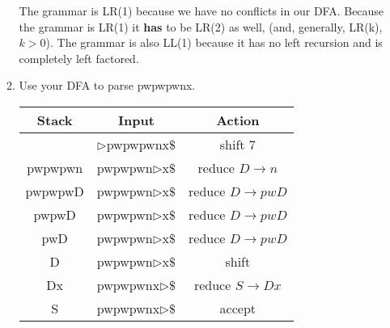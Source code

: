 \begin{enumerate}
\begin{enumerate}
        The grammar is LR(1) because we have no conflicts in our DFA. Because the grammar is LR(1) it \textbf{has} to be LR(2) as well, (and, generally, LR(k), $k > 0$). The grammar is also LL(1) because it has no left recursion and is completely left factored.\\
        \item Use your DFA to parse pwpwpwnx.
            \begin{center}
            \begin{tabular}{c c c}
               Stack & Input & Action\\
               \hline
                 & $\triangleright$pwpwpwnx$\$$ & shift 7\\
                 pwpwpwn & pwpwpwn$\triangleright$x$\$$ & reduce $D \rightarrow n$\\
                 pwpwpwD & pwpwpwn$\triangleright$x$\$$ & reduce $D \rightarrow pwD$\\
                 pwpwD & pwpwpwn$\triangleright$x$\$$ & reduce $D \rightarrow pwD$\\
                 pwD & pwpwpwn$\triangleright$x$\$$ & reduce $D \rightarrow pwD$\\
                 D & pwpwpwn$\triangleright$x$\$$ & shift\\
                 Dx & pwpwpwnx$\triangleright$$\$$ & reduce $S \rightarrow Dx$\\
                 S & pwpwpwnx$\triangleright$$\$$ & accept
            \end{tabular}
            \end{center}
    \end{enumerate}
\end{enumerate}

